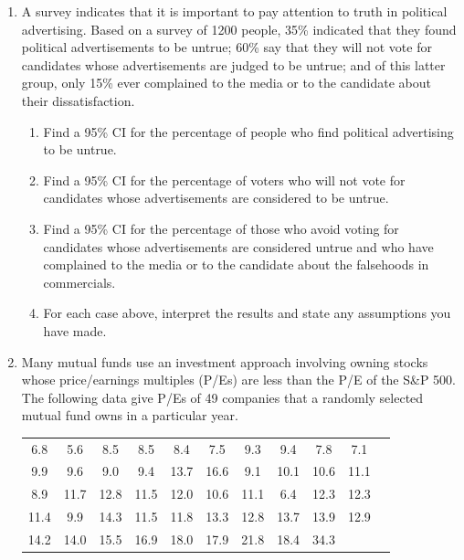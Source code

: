 \begin{enumerate}
    \item[\textbf{5.5.1.}] A survey indicates that it is important to pay attention to truth in political advertising. Based on a survey of 1200 people, 35\% indicated that they found political advertisements to be untrue; 60\% say that they will not vote for candidates whose advertisements are judged to be untrue; and of this latter group, only 15\% ever complained to the media or to the candidate about their dissatisfaction.
    \begin{enumerate}
        \item[(a)] Find a 95\% CI for the percentage of people who find political advertising to be untrue.
        \item[(b)] Find a 95\% CI for the percentage of voters who will not vote for candidates whose advertisements are considered to be untrue.
        \item[(c)] Find a 95\% CI for the percentage of those who avoid voting for candidates whose advertisements are considered untrue and who have complained to the media or to the candidate about the falsehoods in commercials.
        \item[(d)] For each case above, interpret the results and state any assumptions you have made.
    \end{enumerate}

    \item[\textbf{5.5.2.}] Many mutual funds use an investment approach involving owning stocks whose price/earnings multiples (P/Es) are less than the P/E of the S\&P 500. The following data give P/Es of 49 companies that a randomly selected mutual fund owns in a particular year.

    \begin{center}
    \begin{tabular}{ccccccccccc}
    6.8 & 5.6 & 8.5 & 8.5 & 8.4 & 7.5 & 9.3 & 9.4 & 7.8 & 7.1 \\
    9.9 & 9.6 & 9.0 & 9.4 & 13.7 & 16.6 & 9.1 & 10.1 & 10.6 & 11.1 \\
    8.9 & 11.7 & 12.8 & 11.5 & 12.0 & 10.6 & 11.1 & 6.4 & 12.3 & 12.3 \\
    11.4 & 9.9 & 14.3 & 11.5 & 11.8 & 13.3 & 12.8 & 13.7 & 13.9 & 12.9 \\
    14.2 & 14.0 & 15.5 & 16.9 & 18.0 & 17.9 & 21.8 & 18.4 & 34.3 & \\
    \end{tabular}
    \end{center}


\end{enumerate}
